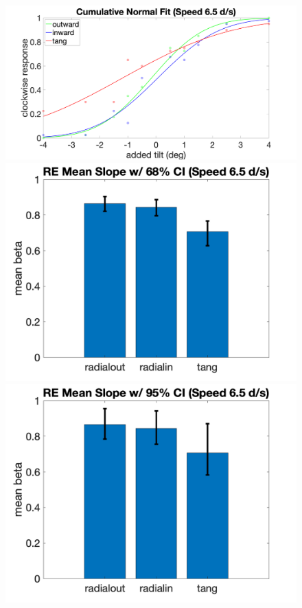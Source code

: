 \documentclass[11pt]{article} %
\begin{document}
\newpage
\begin{figure}[H]
\centering %
\includegraphics[scale=.08]{Images/PF_speed6.5.png}
\\
\includegraphics[scale=.2]{Images/MeanSlopeError_68ci_RE_speed6.5.png}
\includegraphics[scale=.2]{Images/MeanSlopeError_95ci_RE_speed6.5.png}

\end{figure}
\end{document}

